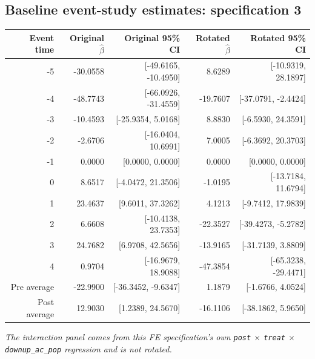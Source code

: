 \documentclass[10pt]{article}
\begin{document}
\subsection*{Baseline event-study estimates: specification 3}
\begin{center}
\scriptsize
\begin{tabular}{r rr rr}
\toprule
Event time & Original $\hat\beta$ & Original 95\% CI & Rotated $\hat\beta$ & Rotated 95\% CI \\
\midrule
-5 & -30.0558 & [-49.6165, -10.4950] & 8.6289 & [-10.9319, 28.1897] \\
-4 & -48.7743 & [-66.0926, -31.4559] & -19.7607 & [-37.0791, -2.4424] \\
-3 & -10.4593 & [-25.9354, 5.0168] & 8.8830 & [-6.5930, 24.3591] \\
-2 & -2.6706 & [-16.0404, 10.6991] & 7.0005 & [-6.3692, 20.3703] \\
-1 & 0.0000 & [0.0000, 0.0000] & 0.0000 & [0.0000, 0.0000] \\
0 & 8.6517 & [-4.0472, 21.3506] & -1.0195 & [-13.7184, 11.6794] \\
1 & 23.4637 & [9.6011, 37.3262] & 4.1213 & [-9.7412, 17.9839] \\
2 & 6.6608 & [-10.4138, 23.7353] & -22.3527 & [-39.4273, -5.2782] \\
3 & 24.7682 & [6.9708, 42.5656] & -13.9165 & [-31.7139, 3.8809] \\
4 & 0.9704 & [-16.9679, 18.9088] & -47.3854 & [-65.3238, -29.4471] \\
\midrule
Pre average & -22.9900 & [-36.3452, -9.6347] & 1.1879 & [-1.6766, 4.0524] \\
Post average & 12.9030 & [1.2389, 24.5670] & -16.1106 & [-38.1862, 5.9650] \\
\bottomrule
\end{tabular}
\end{center}
\medskip
\textit{The interaction panel comes from this FE specification's own \texttt{post} $\times$ \texttt{treat} $\times$ \texttt{downup\_ac\_pop} regression and is not rotated.}
\clearpage
\end{document}

